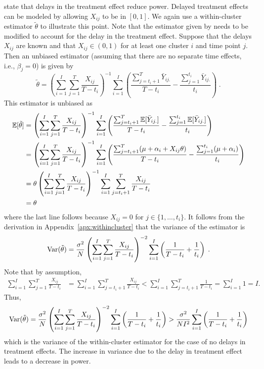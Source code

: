 \documentclass[10pt]{article}
\begin{document}
\textcite{Hussey:2007} state that delays in the treatment effect reduce power. Delayed treatment effects can be modeled by allowing $X_{ij}$ to be in $[0,1]$. We again use a within-cluster estimator $\tilde{\theta}$ to illustrate this point. Note that the estimator given by \citeauthor{Hussey:2007} needs to be modified to account for the delay in the treatment effect. Suppose that the delays $X_{ij}$ are known and that $X_{ij}\in(0,1)$ for at least one cluster $i$ and time point $j$. Then an unbiased estimator (assuming that there are no separate time effects, i.e., $\beta_j=0$) is given by
\[
\tilde{\theta} = \left(\sum_{i=1}^I\sum_{j=1}^T\frac{X_{ij}}{T-t_i}\right)^{-1}\sum_{i=1}^I\left(\frac{\sum_{j=t_i+1}^T\bar{Y}_{ij.}}{T-t_i} - \frac{\sum_{j=1}^{t_i}\bar{Y}_{ij.}}{t_i}\right)\;.
\]
This estimator is unbiased as
\begin{align*}
\mathbb{E}[\tilde{\theta}] &= \left(\sum_{i=1}^I\sum_{j=1}^T\frac{X_{ij}}{T-t_i}\right)^{-1}\sum_{i=1}^I\left(\frac{\sum_{j=t_i+1}^T\mathbb{E}[\bar{Y}_{ij.}]}{T-t_i} - \frac{\sum_{j=1}^{t_i}\mathbb{E}[\bar{Y}_{ij.}]}{t_i}\right) \\
&= \left(\sum_{i=1}^I\sum_{j=1}^T\frac{X_{ij}}{T-t_i}\right)^{-1}\sum_{i=1}^I\left(\frac{\sum_{j=t_i+1}^T(\mu+\alpha_i+X_{ij}\theta)}{T-t_i} - \frac{\sum_{j=1}^{t_i}(\mu+\alpha_i)}{t_i}\right) \\
&= \theta\left(\sum_{i=1}^I\sum_{j=1}^T\frac{X_{ij}}{T-t_i}\right)^{-1}\sum_{i=1}^I\sum_{j=t_i+1}^T\frac{X_{ij}}{T-t_i} \\
&= \theta
\end{align*}
where the last line follows because $X_{ij}=0$ for $j\in\{1,\ldots,t_i\}$. It follows from the derivation in Appendix~\ref{apx:withincluster} that the variance of the estimator is
\[
\mathrm{Var}(\tilde{\theta}) = \frac{\sigma^2}{N}\left(\sum_{i=1}^I\sum_{j=1}^T\frac{X_{ij}}{T-t_i}\right)^{-2}\sum_{i=1}^I\left(\frac{1}{T-t_i} + \frac{1}{t_i}\right) \;.
\]
Note that by assumption,
\begin{align*}
\sum_{i=1}^I\sum_{j=1}^T\frac{X_{ij}}{T-t_i} &= \sum_{i=1}^I\sum_{j=t_i+1}^T\frac{X_{ij}}{T-t_i} < \sum_{i=1}^I\sum_{j=t_i+1}^T\frac{1}{T-t_i} = \sum_{i=1}^I1 = I.
\end{align*}
Thus,
\[
\mathrm{Var}(\tilde{\theta}) = \frac{\sigma^2}{N}\left(\sum_{i=1}^I\sum_{j=1}^T\frac{X_{ij}}{T-t_i}\right)^{-2}\sum_{i=1}^I\left(\frac{1}{T-t_i} + \frac{1}{t_i}\right) > \frac{\sigma^2}{NI^2}\sum_{i=1}^I\left(\frac{1}{T-t_i} + \frac{1}{t_i}\right)
\]
which is the variance of the within-cluster estimator for the case of no delays in treatment effects. The increase in variance due to the delay in treatment effect leads to a decrease in power.
\end{document}
